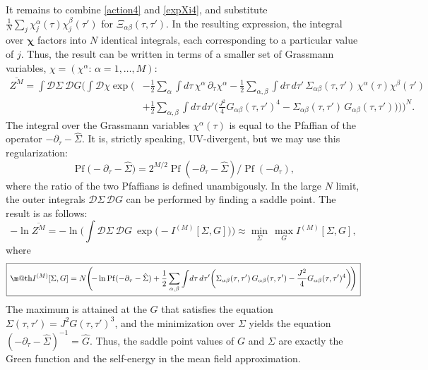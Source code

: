 \documentclass[12pt]{article}
\makeatletter
\newcommand*{\wideboxed}[1]{\setlength{\fboxsep}{1ex}%
  \fbox{\m@th$\displaystyle#1$}}
\newcommand*{\V}[1]{\boldsymbol{#1}}
\newcommand{\calD}{\mathcal{D}}
\DeclareMathOperator{\Pf}{Pf}
\makeatother
\begin{document}
It remains to combine \eqref{action4} and \eqref{expXi4}, and substitute $\frac{1}{N}\sum_{j} \chi_j^\alpha(\tau)\chi_j^\beta(\tau')$ for $\Xi_{\alpha\beta}(\tau,\tau')$. In the resulting expression, the integral over $\V{\chi}$ factors into $N$ identical integrals, each corresponding to a particular value of $j$. Thus, the result can be written in terms of a smaller set of Grassmann variables, $\chi=(\chi^\alpha:\, \alpha=1,\dots,M)$:
\begin{align*}
\overline{Z^M}=\int\calD \Sigma\: \calD G \Biggl(\int\calD\chi
\exp\Biggl(\!
&-\frac{1}{2}\sum_{\alpha}\int d\tau\,\chi^\alpha\,\partial_\tau\chi^\alpha
-\frac{1}{2}\sum_{\alpha,\beta}\int d\tau\,d\tau'\,
\Sigma_{\alpha\beta}(\tau,\tau')\,\chi^\alpha(\tau)\chi^\beta(\tau')\\[2pt]
&+\frac{1}{2}\sum_{\alpha,\beta}\int d\tau\,d\tau'\biggl(
\frac{J^2}{4}G_{\alpha\beta}(\tau,\tau')^4
-\Sigma_{\alpha\beta}(\tau,\tau')\,G_{\alpha\beta}(\tau,\tau')\biggr)
\!\Biggr)\!{\Biggr)\!}^N.
\end{align*}
The integral over the Grassmann variables $\chi^\alpha(\tau)$ is equal to the Pfaffian of the operator $-\partial_\tau-\hat{\Sigma}$. It is, strictly speaking, UV-divergent, but we may use this regularization:
\begin{equation}
\Pf\bigl(-\partial_\tau-\hat{\Sigma}\bigr)
=2^{M/2}\Pf(-\partial_\tau-\hat{\Sigma})/\Pf(-\partial_\tau),
\end{equation}
where the ratio of the two Pfaffians is defined unambigously. In the large $N$ limit, the outer integrals $\calD\Sigma\,\calD G$ can be performed by finding a saddle point. The result is as follows:
\begin{equation}\label{minmax_replicas}
-\ln\overline{Z^M}=-\ln\biggl(\int\calD \Sigma\: \calD G\:
\exp\bigl(-I^{(M)}[\Sigma,G]\bigr)\!\biggr)
\approx\min_{\Sigma}\,\max_{G}I^{(M)}[\Sigma,G],
\end{equation}
where
\begin{equation}\label{effact_replicas}
\wideboxed{
I^{(M)}[\Sigma,G]
=N\Biggl(\!-\ln\Pf(-\partial_\tau-\hat{\Sigma})
+\frac{1}{2}\sum_{\alpha,\beta}\int\! d\tau\,d\tau'
\biggl(\Sigma_{\alpha\beta}(\tau,\tau')\,G_{\alpha\beta}(\tau,\tau')
-\frac{J^2}{4}G_{\alpha\beta}(\tau,\tau')^4\biggr)\!\Biggr)
}
\end{equation}
The maximum is attained at the $G$ that satisfies the equation $\Sigma(\tau,\tau')=J^2 G(\tau,\tau')^3$, and the minimization over $\Sigma$ yields the equation $(-\partial_\tau-\hat\Sigma)^{-1}=\hat{G}$. Thus, the saddle point values of $G$ and $\Sigma$ are exactly the Green function and the self-energy in the mean field approximation.
\end{document}
